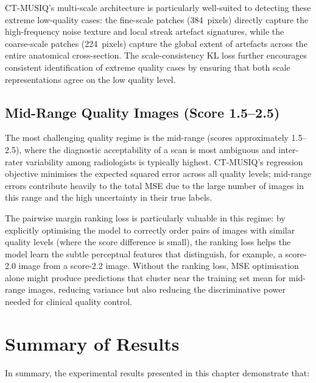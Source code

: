 CT-MUSIQ's multi-scale architecture is particularly well-suited to detecting these
extreme low-quality cases: the fine-scale patches (384~pixels) directly capture the
high-frequency noise texture and local streak artefact signatures, while the coarse-scale
patches (224~pixels) capture the global extent of artefacts across the entire anatomical
cross-section. The scale-consistency KL loss further encourages consistent identification
of extreme quality cases by ensuring that both scale representations agree on the low
quality level.

\subsection{Mid-Range Quality Images (Score 1.5--2.5)}

The most challenging quality regime is the mid-range (scores approximately 1.5--2.5),
where the diagnostic acceptability of a scan is most ambiguous and inter-rater variability
among radiologists is typically highest. CT-MUSIQ's regression objective minimises the
expected squared error across all quality levels; mid-range errors contribute heavily
to the total MSE due to the large number of images in this range and the high uncertainty
in their true labels.

The pairwise margin ranking loss is particularly valuable in this regime: by explicitly
optimising the model to correctly order pairs of images with similar quality levels (where
the score difference is small), the ranking loss helps the model learn the subtle
perceptual features that distinguish, for example, a score-2.0 image from a score-2.2
image. Without the ranking loss, MSE optimisation alone might produce predictions that
cluster near the training set mean for mid-range images, reducing variance but also
reducing the discriminative power needed for clinical quality control.


\section{Summary of Results}

In summary, the experimental results presented in this chapter demonstrate that:

